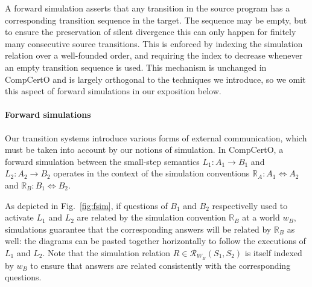 \documentclass[acmsmall,screen,review,anonymous]{acmart}
\newcommand{\kw}[1]{\ensuremath{ \mathsf{#1} }}
\begin{document}

A forward simulation asserts that any transition in the source program
has a corresponding transition sequence in the target.
The sequence may be empty,
but to ensure the preservation of silent divergence
this can only happen for finitely many consecutive source transitions.
This is enforced by indexing the simulation relation
over a well-founded order,
and requiring the index to decrease
whenever an empty transition sequence is used.
This mechanism is unchanged in CompCertO
and is largely orthogonal to the techniques we introduce,
so we omit this aspect of forward simulations
in our exposition below.

\paragraph{Forward simulations} %

Our transition systems introduce
various forms of external communication,
which must be taken into account by our notions of simulation.
In CompCertO,
a forward simulation between the small-step semantics
$L_1 : A_1 \rightarrow B_1$ and
$L_2 : A_2 \rightarrow B_2$
operates in the context of the simulation conventions
$\mathbb{R}_A : A_1 \Leftrightarrow A_2$ and
$\mathbb{R}_B : B_1 \Leftrightarrow B_2$.

As depicted in Fig.~\ref{fig:fsim},
if questions of $B_1$ and $B_2$
respectivelly used to activate $L_1$ and $L_2$
are related by the simulation convention $\mathbb{R}_B$
at a world $w_B$,
simulations guarantee that the corresponding answers will be related
by $\mathbb{R}_B$ as well:
the diagrams
can be pasted together horizontally
to follow the executions of $L_1$ and $L_2$.
Note that
the simulation relation $R \in \mathcal{R}_{W_B}(S_1, S_2)$
is itself indexed by $w_B$
to ensure that answers
are related consistently with the corresponding questions.
\end{document}
